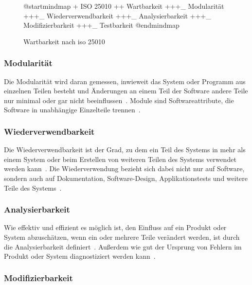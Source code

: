\documentclass[12pt, a4paper, ngerman]{article}
\begin{document}
\begin{figure}
  \centering
  \begin{plantuml}
      @startmindmap
      + ISO 25010
      ++ Wartbarkeit
      +++_ Modularität
      +++_ Wiederverwendbarkeit
      +++_ Analysierbarkeit
      +++_ Modifizierbarkeit
      +++_ Testbarkeit
      @endmindmap
  \end{plantuml}
  \caption{Wartbarkeit nach \ac{iso} 25010\cite{ISO25010}}
  \label{fig:uml:maintainability}
\end{figure}

\subsubsection{Modularität}

Die Modularität wird daran gemessen,
inwieweit das System oder Programm aus einzelnen Teilen besteht
und Änderungen an einem Teil der Software andere Teile nur minimal oder gar nicht beeinflussen~\cite{ISO25010}.
Module sind Softwareattribute, die Software in unabhängige Einzelteile trennen~\cite{IEEE24765}.

\subsubsection{Wiederverwendbarkeit}

Die Wiederverwendbarkeit ist der Grad, 
zu dem ein Teil des Systems in mehr als einem System
oder beim Erstellen von weiteren Teilen des Systems verwendet werden kann~\cite{ISO25010}.
Die Wiederverwendung bezieht sich dabei nicht nur auf Software,
sondern auch auf Dokumentation, Software-Design, Applikationstests und weitere Teile des Systems~\cite{IEEE1517}.

\subsubsection{Analysierbarkeit}

Wie effektiv und effizient es möglich ist,
den Einfluss auf ein Produkt oder System abzuschätzen,
wenn ein oder mehrere Teile verändert werden,
ist durch die Analysierbarkeit definiert~\cite{ISO25010}.
Außerdem wie gut der Ursprung von Fehlern
im Produkt oder System diagnostiziert werden kann~\cite{ISO25010}.

\subsubsection{Modifizierbarkeit}
\end{document}
